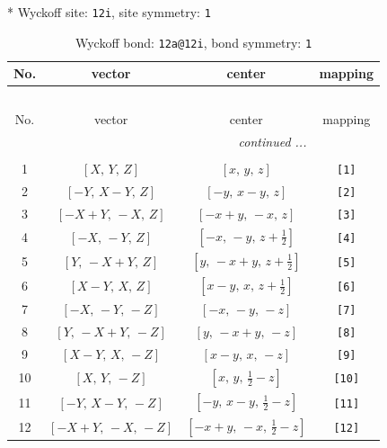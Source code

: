 \documentclass[fleqn,8pt]{jsarticle}
\begin{document}
* Wyckoff site: {\tt 12i}, site symmetry: {\tt 1}
\renewcommand{\arraystretch}{1.2}
\begin{longtable}{cccc}
\caption{Wyckoff bond: {\tt 12a@12i}, bond symmetry: {\tt 1}}
 \\
 \hline \hline
No. & vector & center & mapping \\ \hline \endfirsthead

\multicolumn{3}{l}{\tablename\ \thetable{}} \\
 \hline \hline
No. & vector & center & mapping \\ \hline \endhead

 \hline \hline
\multicolumn{3}{r}{\footnotesize\it continued ...} \\ \endfoot

 \hline \hline
\multicolumn{3}{r}{} \\ \endlastfoot

1 & $\left[ X,\, Y,\, Z \right]$ & $\left[ x,\, y,\, z \right]$ & {\tt [1]} \\ \hline
2 & $\left[ - Y,\, X - Y,\, Z \right]$ & $\left[ - y,\, x - y,\, z \right]$ & {\tt [2]} \\ \hline
3 & $\left[ - X + Y,\, - X,\, Z \right]$ & $\left[ - x + y,\, - x,\, z \right]$ & {\tt [3]} \\ \hline
4 & $\left[ - X,\, - Y,\, Z \right]$ & $\left[ - x,\, - y,\, z + \frac{1}{2} \right]$ & {\tt [4]} \\ \hline
5 & $\left[ Y,\, - X + Y,\, Z \right]$ & $\left[ y,\, - x + y,\, z + \frac{1}{2} \right]$ & {\tt [5]} \\ \hline
6 & $\left[ X - Y,\, X,\, Z \right]$ & $\left[ x - y,\, x,\, z + \frac{1}{2} \right]$ & {\tt [6]} \\ \hline
7 & $\left[ - X,\, - Y,\, - Z \right]$ & $\left[ - x,\, - y,\, - z \right]$ & {\tt [7]} \\ \hline
8 & $\left[ Y,\, - X + Y,\, - Z \right]$ & $\left[ y,\, - x + y,\, - z \right]$ & {\tt [8]} \\ \hline
9 & $\left[ X - Y,\, X,\, - Z \right]$ & $\left[ x - y,\, x,\, - z \right]$ & {\tt [9]} \\ \hline
10 & $\left[ X,\, Y,\, - Z \right]$ & $\left[ x,\, y,\, \frac{1}{2} - z \right]$ & {\tt [10]} \\ \hline
11 & $\left[ - Y,\, X - Y,\, - Z \right]$ & $\left[ - y,\, x - y,\, \frac{1}{2} - z \right]$ & {\tt [11]} \\ \hline
12 & $\left[ - X + Y,\, - X,\, - Z \right]$ & $\left[ - x + y,\, - x,\, \frac{1}{2} - z \right]$ & {\tt [12]} \\
\end{longtable}
\end{document}

